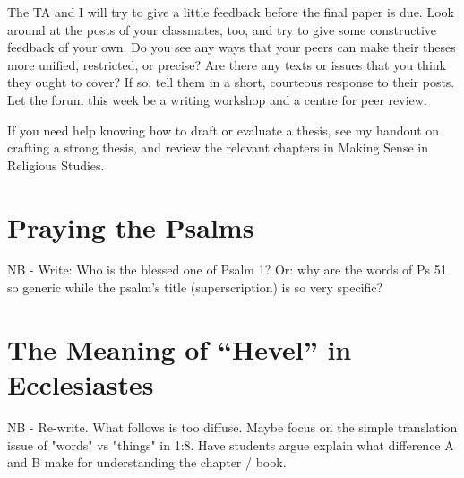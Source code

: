 \documentclass[12pt]{article}
\begin{document}
The TA and I will try to give a little feedback before the final paper is due. Look around at the posts of your classmates, too, and try to give some constructive feedback of your own. Do you see any ways that your peers can make their theses more unified, restricted, or precise? Are there any texts or issues that you think they ought to cover? If so, tell them in a short, courteous response to their posts. Let the forum this week be a writing workshop and a centre for peer review.

If you need help knowing how to draft or evaluate a thesis, see my handout on crafting a strong thesis, and review the relevant chapters in Making Sense in Religious Studies.


\section{Praying the Psalms}


NB - Write: Who is the blessed one of Psalm 1? Or: why are the words of Ps 51 so generic while the psalm's title (superscription) is so very specific?

\section{The Meaning of “Hevel” in Ecclesiastes}

NB - Re-write. What follows is too diffuse. Maybe focus on the simple translation issue of "words" vs "things" in 1:8. Have students argue explain what difference A and B make for understanding the chapter / book.

%
%
%
\end{document}
